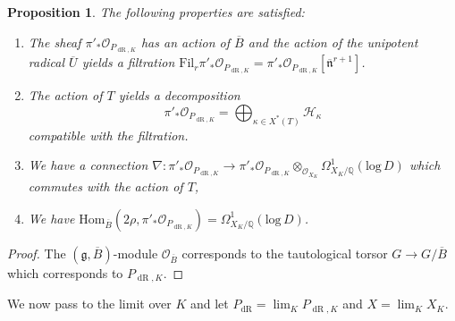 \documentclass[10pt, oneside]{amsart}
\numberwithin{equation}{subsection}
\newtheorem{proposition}[equation]{Proposition}
\theoremstyle{definition}
\theoremstyle{remark}
\newcommand{\opn}[1]{\operatorname{#1}}
\def\Q{\mathbb{Q}}
\def\oscr{\mathscr{O}}
\begin{document}
\begin{proposition} \label{OPdrKPropAppendix}
The following properties are satisfied:
\begin{enumerate}

\item The sheaf $\pi'_* \mathcal{O}_{P_{\opn{dR},K}}$ has an action of $\overline{B}$ and the action of the unipotent radical $\overline{U}$ yields a filtration $\mathrm{Fil}_r \pi'_* \mathcal{O}_{P_{\opn{dR},K}} = \pi'_* \mathcal{O}_{P_{\opn{dR},K}}[\overline{\mathfrak{n}}^{r+1}]$. 
\item The action of $T$ yields a decomposition 
\[
\pi'_* \mathcal{O}_{P_{\opn{dR},K}} = \bigoplus_{\kappa \in X^*(T)} \mathcal{H}_\kappa
\]
compatible with the filtration. 
\item  We have a connection $\nabla : \pi'_* \mathcal{O}_{P_{\opn{dR},K}} \rightarrow \pi'_* \mathcal{O}_{P_{\opn{dR},K}} \otimes_{\mathcal{O}_{X_K}} \Omega^1_{X_K/\Q}(\mathrm{log} \, D)$ which commutes with the action of $T$,
\item We have  $\mathrm{Hom}_{\overline{B}} ( 2\rho, \pi'_* \mathcal{O}_{P_{\opn{dR},K}}) = \Omega^1_{X_K/\Q}(\mathrm{log}\,D)$.
\end{enumerate}
\end{proposition}
\begin{proof} The $(\mathfrak{g},\overline{B})$-module $\oscr_{\overline{B}}$ corresponds to the tautological torsor $G \rightarrow G/\overline{B}$ which corresponds to $P_{\opn{dR}, K}$. \end{proof}



We now pass to the limit over $K$ and let $P_{\opn{dR}} = \lim_K P_{\opn{dR},K}$ and $X = \lim_K X_K$. 
\end{document}
